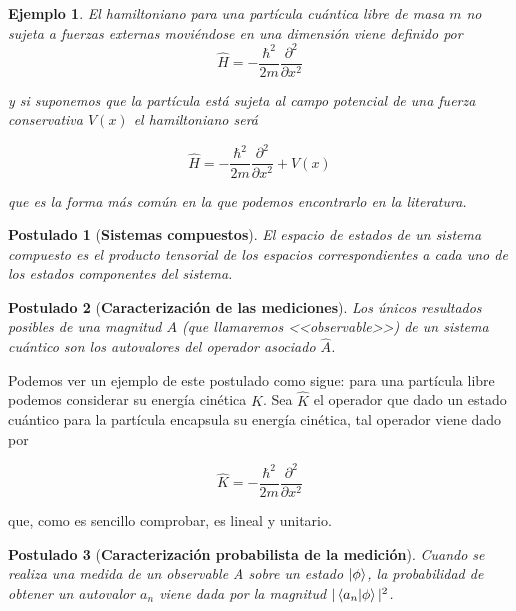 \documentclass[11pt, spanish]{report}
\numberwithin{equation}{section}
\newtheorem{ejs}[defin]{Ejemplo}
\newtheorem{postu}{Postulado}
\numberwithin{defin}{section}
\begin{document}
\begin{appendices}
\begin{ejs}
El hamiltoniano para una partícula cuántica libre de masa $m$ no sujeta a fuerzas externas moviéndose en una dimensión viene definido por
\begin{equation}
\hat{H}=-\frac{\hbar^2}{2m}\frac{\partial^2}{\partial x^2}
\end{equation}

y si suponemos que la partícula está sujeta al campo potencial de una fuerza conservativa $V(x)$ el hamiltoniano será

\begin{equation}
\hat{H}=-\frac{\hbar^2}{2m}\frac{\partial^2}{\partial x^2}+V(x)
\end{equation}

que es la forma más común en la que podemos encontrarlo en la literatura.
\end{ejs}

\begin{postu}[\textbf{Sistemas compuestos}] \label{post:4}El espacio de estados de un sistema compuesto es el producto tensorial de los espacios correspondientes a cada uno de los estados componentes del sistema. 
\end{postu}

\begin{postu}[\textbf{Caracterización de las mediciones}] \label{post:5}Los únicos resultados posibles de una magnitud $A$ (que llamaremos <<observable>>) de un sistema cuántico son los autovalores del operador asociado $\hat{A}$.
\end{postu}

Podemos ver un ejemplo de este postulado como sigue: para una partícula libre podemos considerar su energía cinética $K$. Sea $\hat{K}$ el operador que dado un estado cuántico para la partícula encapsula su energía cinética, tal operador viene dado por

\begin{equation}
\hat{K}=-\frac{\hbar^2}{2m}\frac{\partial^2}{\partial x^2}
\end{equation}

que, como es sencillo comprobar, es lineal y unitario.

\begin{postu}[\textbf{Caracterización probabilista de la medición}] \label{post:6} Cuando se realiza una medida de un observable A sobre un estado $\ket{\phi}$, la probabilidad de obtener un autovalor $a_n$ viene dada por la magnitud $|\bra{a_n}\ket{\phi}|^2$.
\end{postu}


\end{appendices}
\end{document}
